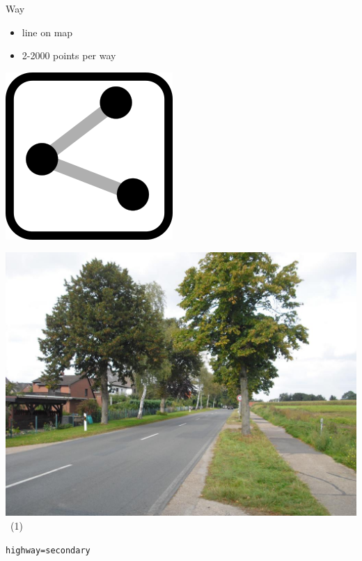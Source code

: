 \documentclass{beamer}
\begin{document}
	\begin{frame}{Way}
		\begin{itemize}
			\item line on map
			\item 2-2000 points per way
		\end{itemize}
		
		\vfill
		
		\begin{center}
			\begin{minipage}[b][0.6\textheight][c]{0.2\linewidth}
				\centering
				\includegraphics[width=0.5\linewidth,height=0.5\textheight,keepaspectratio]{images/240px-Mf_way.png}
			\end{minipage}
			\begin{minipage}[b][0.6\textheight][c]{0.4\linewidth}
				\centering
				\includegraphics[width=0.8\linewidth,height=0.8\textheight,keepaspectratio]{images/Meyenburg-L134.jpg}~\tiny{(1)}
			\end{minipage}
			\begin{minipage}[b][0.6\textheight][c]{0.3\linewidth}
				\texttt{highway=secondary}
				\begin{center}

\end{center}
\end{minipage}
\end{center}
\end{frame}
\end{document}
